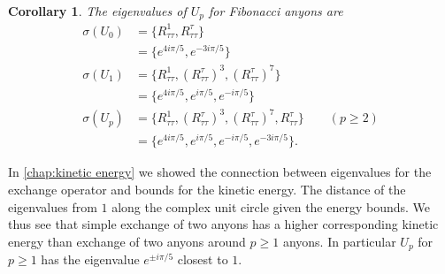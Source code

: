 \documentclass[a4paper,10pt,oneside]{book}
\theoremstyle{plain}
\newtheorem{corollary}[theorem]{Corollary}
\theoremstyle{definition}
\theoremstyle{remark}
\begin{document}
\begin{corollary}
  The eigenvalues of $U_p$ for Fibonacci anyons are
  \begin{align*}
    \sigma(U_0) &=
    \{
      R_{ττ}^1,
      R_{ττ}^τ
    \} \\
    & =
    \{
      e^{4iπ/5},
      e^{-3iπ/5}
    \} \\
    \sigma(U_1) &=
    \{
      R_{ττ}^1,
      \left( R_{ττ}^τ \right)^3,
      \left( R_{ττ}^τ \right)^7
    \} \\
    & =
    \{
      e^{4iπ/5},
      e^{iπ/5},
      e^{-iπ/5}
    \} \\
    \sigma(U_p) &=
    \{
      R_{ττ}^1,
      \left( R_{ττ}^τ \right)^3,
      \left( R_{ττ}^τ \right)^7,
      R_{ττ}^τ
    \} \quad\quad (p \ge 2) \\
    & =
    \{
      e^{4 i π/5},
      e^{i π/5},
      e^{-i π/5},
      e^{-3 i π/5}
    \}.
  \end{align*}

  \begin{center}
  \end{center}

\end{corollary}

In \cref{chap:kinetic energy} we showed the connection between eigenvalues for the exchange operator and bounds for the kinetic energy. The distance of the eigenvalues from $1$ along the complex unit circle given the energy bounds. We thus see that simple exchange of two anyons has a higher corresponding kinetic energy than exchange of two anyons around $p \ge 1$ anyons. In particular $U_p$ for $p \ge 1$ has the eigenvalue $e^{\pm iπ/5}$ closest to $1$.
\end{document}
